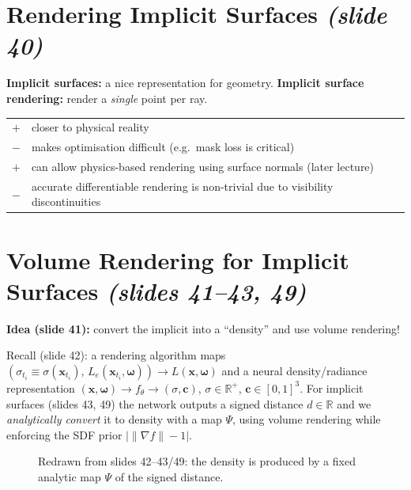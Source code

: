 \documentclass[11pt,a4paper]{article}
\newcommand{\R}{\mathbb{R}}
\newcommand{\bx}{{\bm{x}}}
\newcommand{\bc}{{\bm{c}}}
\newcommand{\bom}{{\bm{\omega}}}
\begin{document}
\section{Rendering Implicit Surfaces \emph{(slide 40)}}
\textbf{Implicit surfaces:} a nice representation for geometry. \textbf{Implicit surface rendering:} render a \emph{single}
point per ray.
\begin{center}
\begin{tabular}{@{}cp{11cm}@{}}
\textcolor{green!50!black}{$+$} & closer to physical reality\\
\textcolor{red!70!black}{$-$} & makes optimisation difficult (e.g.\ mask loss is critical)\\
\textcolor{green!50!black}{$+$} & can allow physics-based rendering using surface normals (later lecture)\\
\textcolor{red!70!black}{$-$} & accurate differentiable rendering is non-trivial due to visibility discontinuities
\end{tabular}
\end{center}

\section{Volume Rendering for Implicit Surfaces \emph{(slides 41--43, 49)}}
\textbf{Idea (slide 41):} convert the implicit into a ``density'' and use volume rendering!

Recall (slide 42): a rendering algorithm maps $(\sigma_{t_i}\equiv\sigma(\bx_{t_i}),\,L_e(\bx_{t_i},\bom))\to L(\bx,\bom)$ and
a neural density/radiance representation $(\bx,\bom)\to f_\theta\to(\sigma,\bc)$, $\sigma\in\R^+$, $\bc\in[0,1]^3$.
For implicit surfaces (slides 43, 49) the network outputs a signed distance $d\in\R$ and we \emph{analytically
convert} it to density with a map $\Psi$, using volume rendering while enforcing the SDF prior $\bigl|\|\nabla f\|-1\bigr|$.

\begin{figure}[htbp]
\centering
{}
\caption{Redrawn from slides 42--43/49: the density is produced by a fixed analytic map $\Psi$ of the signed distance.}
\end{figure}
\end{document}
